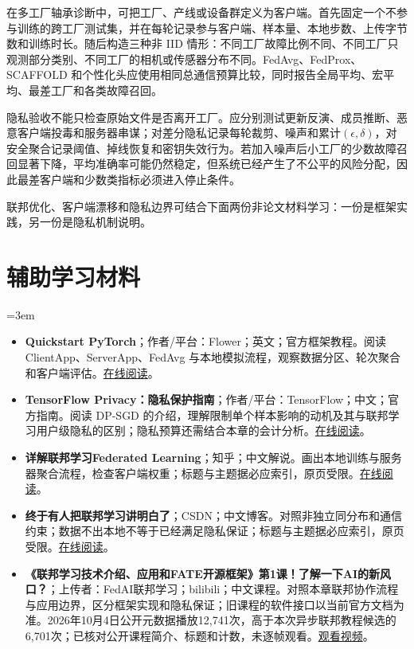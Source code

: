 在多工厂轴承诊断中，可把工厂、产线或设备群定义为客户端。首先固定一个不参与训练的跨工厂测试集，并在每轮记录参与客户端、样本量、本地步数、上传字节数和训练时长。随后构造三种非 IID 情形：不同工厂故障比例不同、不同工厂只观测部分类别、不同工厂的相机或传感器分布不同。FedAvg、FedProx、SCAFFOLD 和个性化头应使用相同总通信预算比较，同时报告全局平均、宏平均、最差工厂和各类故障召回。

隐私验收不能只检查原始文件是否离开工厂。应分别测试更新反演、成员推断、恶意客户端投毒和服务器串谋；对差分隐私记录每轮裁剪、噪声和累计$(\epsilon,\delta)$，对安全聚合记录阈值、掉线恢复和密钥失效行为。若加入噪声后小工厂的少数故障召回显著下降，平均准确率可能仍然稳定，但系统已经产生了不公平的风险分配，因此最差客户端和少数类指标必须进入停止条件。

联邦优化、客户端漂移和隐私边界可结合下面两份非论文材料学习：一份是框架实践，另一份是隐私机制说明。
\section*{辅助学习材料}
\begingroup
\emergencystretch=3em
\begin{itemize}
\item \textbf{Quickstart PyTorch}；作者/平台：Flower；英文；官方框架教程。阅读 ClientApp、ServerApp、FedAvg 与本地模拟流程，观察数据分区、轮次聚合和客户端评估。\href{https://flower.ai/docs/framework/tutorial-quickstart-pytorch.html}{在线阅读}。
\item \textbf{TensorFlow Privacy：隐私保护指南}；作者/平台：TensorFlow；中文；官方指南。阅读 DP-SGD 的介绍，理解限制单个样本影响的动机及其与联邦学习用户级隐私的区别；隐私预算还需结合本章的会计分析。\href{https://tensorflow.google.cn/responsible\_ai/privacy}{在线阅读}。
\item \textbf{详解联邦学习Federated Learning}；知乎；中文解说。画出本地训练与服务器聚合流程，检查客户端权重；标题与主题据必应索引，原页受限。\href{https://zhuanlan.zhihu.com/p/79284686}{在线阅读}。
\item \textbf{终于有人把联邦学习讲明白了}；CSDN；中文博客。对照非独立同分布和通信约束；数据不出本地不等于已经满足隐私保证；标题与主题据必应索引，原页受限。\href{https://blog.csdn.net/hzbooks/article/details/118097998}{在线阅读}。
\item \textbf{《联邦学习技术介绍、应用和FATE开源框架》第1课！了解一下AI的新风口？}；上传者：FedAI联邦学习；bilibili；中文课程。对照本章联邦协作流程与应用边界，区分框架实现和隐私保证；旧课程的软件接口以当前官方文档为准。2026年10月4日公开元数据播放12,741次，高于本次异步联邦教程候选的6,701次；已核对公开课程简介、标题和计数，未逐帧观看。\href{https://www.bilibili.com/video/BV1JE411p72s/}{观看视频}。
\end{itemize}
\endgroup
